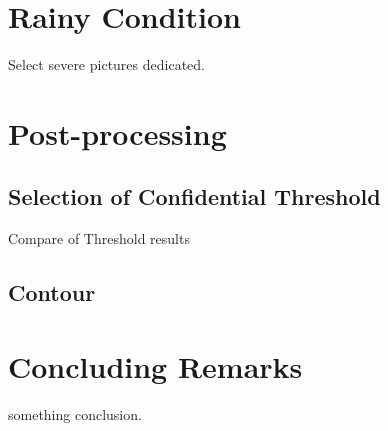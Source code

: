 \begin{spacing}{1.5}
\section{Rainy Condition}

Select severe pictures dedicated.

\section{Post-processing}

\subsection{Selection of Confidential Threshold}

Compare of Threshold results

\subsection{Contour}


\section{Concluding Remarks}

something conclusion.

\end{spacing}
\newpage
